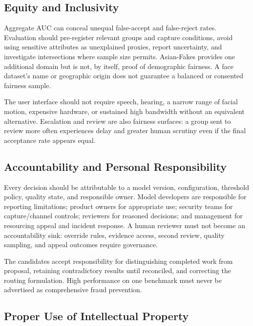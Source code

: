 \subsection{Equity and Inclusivity}

Aggregate AUC can conceal unequal false-accept and false-reject rates. Evaluation
should pre-register relevant groups and capture conditions, avoid using sensitive
attributes as unexplained proxies, report uncertainty, and investigate
intersections where sample size permits. Asian-Fakes provides one additional
domain but is not, by itself, proof of demographic fairness. A face dataset's name
or geographic origin does not guarantee a balanced or consented fairness sample.

The user interface should not require speech, hearing, a narrow range of facial
motion, expensive hardware, or sustained high bandwidth without an equivalent
alternative. Escalation and review are also fairness surfaces: a group sent to
review more often experiences delay and greater human scrutiny even if the final
acceptance rate appears equal.

\subsection{Accountability and Personal Responsibility}

Every decision should be attributable to a model version, configuration,
threshold policy, quality state, and responsible owner. Model developers are
responsible for reporting limitations; product owners for appropriate use;
security teams for capture/channel controls; reviewers for reasoned decisions;
and management for resourcing appeal and incident response. A human reviewer must
not become an accountability sink: override rules, evidence access, second review,
quality sampling, and appeal outcomes require governance.

The candidates accept responsibility for distinguishing completed work from
proposal, retaining contradictory results until reconciled, and correcting the
routing formulation. High performance on one benchmark must never be advertised
as comprehensive fraud prevention.

\subsection{Proper Use of Intellectual Property}

